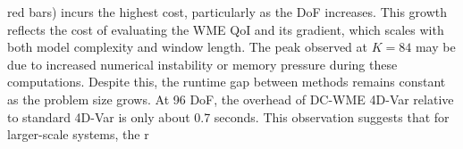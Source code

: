 \documentclass[final,1p,times]{elsarticle}
\begin{document}
red bars) incurs the highest cost, particularly as the DoF increases. 
This growth reflects the cost of evaluating the WME QoI and its gradient, which scales with both model complexity and window length. 
The peak observed at $K=84$ may be due to increased numerical instability or memory pressure during these computations. 
Despite this, the runtime gap between methods remains constant as the problem size grows. 
At 96 DoF, the overhead of DC-WME 4D-Var relative to standard 4D-Var is only about 0.7 seconds. 
This observation suggests that for larger-scale systems, the r
\end{document}
